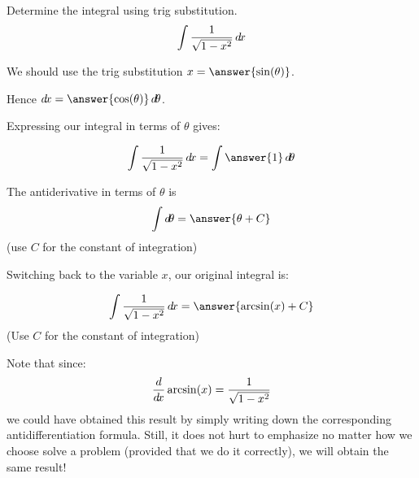 \documentclass{ximera}
\author{Jason Miller}
\begin{document}
\begin{exercise}
Determine the integral using trig substitution. 
\[
\int \frac{1}{\sqrt{1-x^{2}}} \mathop{}\!d\! x
\]

We should use the trig substitution $x=\answer{ \sin(\theta)}$. 

Hence $\d x=\answer{ \cos(\theta) } \d \theta$.

Expressing our integral in terms of $\theta$ gives:

\begin{exercise}

\[
\int \frac{1}{\sqrt{1-x^{2}}} \d x=\int \answer{ 1  }   \d \theta 
\]


\begin{exercise}
The antiderivative in terms of $\theta$ is 
\[
\int \d \theta = \answer{ \theta + C}
\]
(use $C$ for the constant of integration)

\begin{exercise}
Switching back to the variable $x$, our original integral is:

\[
\int \frac{1}{\sqrt{1-x^{2}}} \d x= \answer{ \arcsin(x) + C }
\]
(Use $C$ for the constant of integration)

\begin{exercise}
Note that since:
\[
\frac{d}{\mathop{}\!d\! x} \arcsin(x)=\frac{1}{\sqrt{1-x^{2}}}
\]
we could have obtained this result by simply writing down the corresponding antidifferentiation formula.  Still, it does not hurt to emphasize no matter how we choose solve a problem (provided that we do it correctly), we will obtain the same result!

\end{exercise}
\end{exercise}
\end{exercise}
\end{exercise}
\end{exercise}
\end{document}
